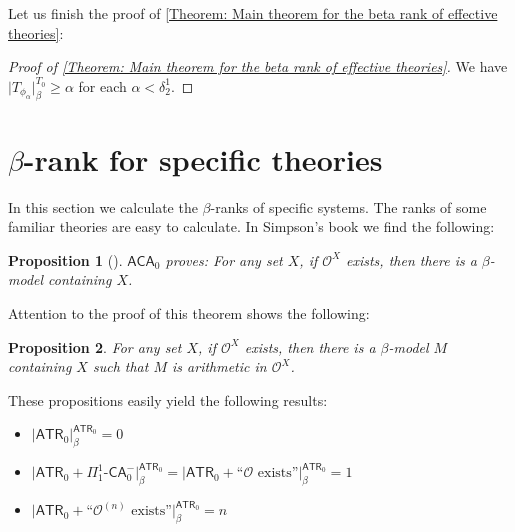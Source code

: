 \documentclass{amsart}
\newtheorem{proposition}[proposition]{Proposition}
\theoremstyle{remark}
\newtheorem{definition}[definition]{Definition}
\newcommand{\ATR}{\mathsf{ATR}}
\begin{document}
Let us finish the proof of \autoref{Theorem: Main theorem for the beta rank of effective theories}:

\begin{proof}[Proof of \autoref{Theorem: Main theorem for the beta rank of effective theories}]
    We have $\lvert T_{\phi_\alpha}\rvert^{T_0}_\beta \ge \alpha$ for each $\alpha<\delta^1_2$.
\end{proof}

\section{\texorpdfstring{$\beta$}{Beta}-rank for specific theories}

In this section we calculate the $\beta$-ranks of specific systems. The ranks of some familiar theories are easy to calculate. In Simpson's book we find the following:

\begin{proposition}[{\cite[Lemma VII.2.9]{simpson2009subsystems}}]
    $\mathsf{ACA}_0$ proves: For any set $X$, if $\mathcal{O}^X$ exists, then there is a $\beta$-model containing $X$.
\end{proposition}
Attention to the proof of this theorem shows the following:
\begin{proposition}
    For any set $X$, if $\mathcal{O}^X$ exists, then there is a $\beta$-model $M$ containing $X$ such that $M$ is arithmetic in $\mathcal{O}^X$.
\end{proposition}

These propositions easily yield the following results:
\begin{itemize}
\item $\lvert\mathsf{ATR}_0\rvert^{\ATR_0}_\beta = 0$
\item $\lvert\mathsf{ATR}_0+\Pi^1_1\text{-} \mathsf{CA}_0^-\rvert^{\ATR_0}_\beta = \lvert \mathsf{ATR}_0+ \text{``$\mathcal{O}$ exists''} \rvert^{\ATR_0}_\beta = 1$
\item $\lvert \mathsf{ATR}_0+ \text{``$\mathcal{O}^{(n)}$ exists''} \rvert^{\ATR_0}_\beta = n$
\end{itemize}
\end{document}
